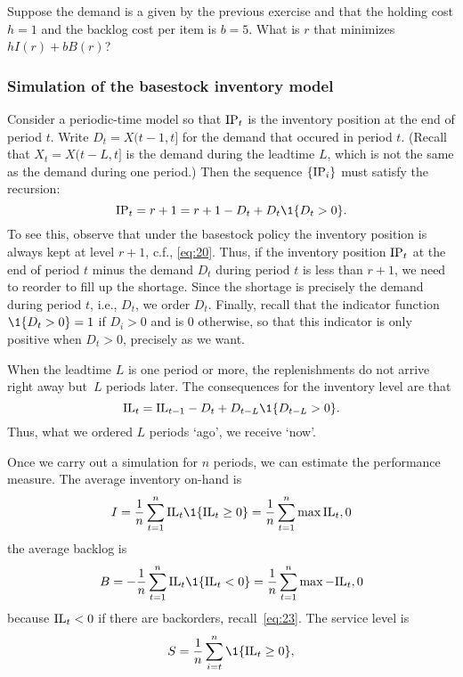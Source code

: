 \begin{question}
Suppose the demand is a given by the previous exercise and that the holding cost $h=1$ and the backlog cost per item is $b=5$.  What is $r$ that minimizes $hI(r)+bB(r)$?
\end{question}


\subsubsection{Simulation of the basestock inventory model}
\label{sec:simul-basest-invent}

Consider a periodic-time model so that $\textrm{IP}_t$ is the inventory position at the end of period $t$. Write $D_t = X(t-1, t]$ for the demand that occured in period $t$. (Recall that $X_t = X(t-L, t]$ is the demand during the leadtime $L$, which is not the same as the demand during one period.)
 Then the sequence $\{\textrm{IP}_i\}$ must satisfy the recursion:
\begin{equation}
  \label{eq:15}
  \IP_t = r+1 = r+1 - D_t + D_t \1{D_t>0}.
\end{equation}
To see this, observe that under the basestock policy the inventory
position is always kept at level $r+1$, c.f., \eqref{eq:20}. Thus, if
the inventory position $\textrm{IP}_t$ at the end of period $t$ minus the demand
$D_t$ during period $t$ is less than $r+1$, we need to reorder to fill up the
shortage. Since the shortage is precisely the demand during period
$t$, i.e., $D_t$, we order $D_t$. Finally, recall that the indicator function $\1{D_t>0} = 1$ if
$D_i>0$ and is $0$ otherwise, so that this indicator is only positive when $D_t>0$, precisely as we want.

When the leadtime $L$ is one period or more, the replenishments do not arrive right away but~$L$ periods later. The consequences for the inventory level are that
\begin{equation}
  \label{eq:21}
  \IL_t = \IL_{t-1} - D_t + D_{t-L}\1{D_{t-L}>0}.
\end{equation}
Thus, what we ordered $L$ periods `ago', we receive `now'.

Once we carry out a simulation for $n$ periods, we can estimate the
performance measure. The average  inventory on-hand is
\begin{equation}
  \label{eq:22}
  I = \frac 1n \sum_{t=1}^n \IL_t\1{\IL_t \geq 0} = \frac1n\sum_{t=1}^n \max{\IL_t, 0}
\end{equation}
the average backlog  is
\begin{equation}
  B = - \frac 1n \sum_{t=1}^n \IL_t\1{\IL_t < 0} = \frac1n\sum_{t=1}^n \max{-\IL_t, 0}
\end{equation}
because $\textrm{IL}_t<0$ if there are backorders, recall~\eqref{eq:23}. 
The service level is 
\begin{equation}
  \label{eq:22}
  S = \frac 1n \sum_{i=t}^n \1{\IL_t \geq 0},
\end{equation}




